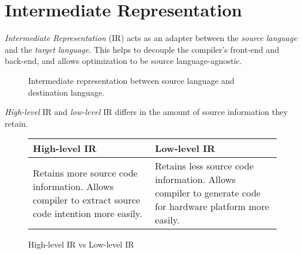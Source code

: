 \section{Intermediate Representation}

\begin{definition}
    \textit{Intermediate Representation} (IR) acts as an adapter between the \textit{source language} and the \textit{target language}. This helps to decouple the compiler's front-end and back-end, and allows optimization to be source language-agnostic.
    
    \begin{figure}[H]
        \centering
        \caption{Intermediate representation between source language and destination language.}
        \label{fig:intermediate-representation}
    \end{figure}
\end{definition}

\begin{definition}
    \textit{High-level} IR and \textit{low-level} IR differs in the amount of source information they retain.
    \begin{figure}[H]
        \centering
        \begin{tabularx}{\textwidth}{@{} X X @{}}
            \toprule
            High-level IR & Low-level IR \\
            \midrule
            Retains more source code information. Allows compiler to extract source code intention more easily. & Retains less source code information. Allows compiler to generate code for hardware platform more easily. \\
            \bottomrule
        \end{tabularx}
        \caption{High-level IR vs Low-level IR}
        \label{fig:high-level-ir-vs-low-level-ir}
    \end{figure}
\end{definition}

